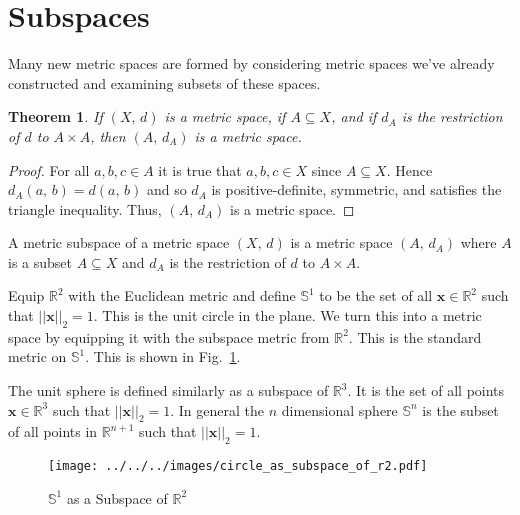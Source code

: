 \documentclass{article}
\theoremstyle{plain}
\newtheorem{theorem}{Theorem}[section]
\theoremstyle{normal}
\newenvironment{example}{%
    \pushQED{\qed}\renewcommand{\qedsymbol}{$\blacksquare$}\examplex%
}{%
    \popQED\endexamplex%
}
\newenvironment{definition}{%
    \pushQED{\qed}\renewcommand{\qedsymbol}{$\blacksquare$}\definitionx%
}{%
    \popQED\enddefinitionx%
}
\begin{document}
    \section{Subspaces}
        Many new metric spaces are formed by considering metric spaces we've
        already constructed and examining subsets of these spaces.
        \begin{theorem}
            If $(X,\,d)$ is a metric space, if $A\subseteq{X}$, and if
            $d_{A}$ is the restriction of $d$ to $A\times{A}$, then
            $(A,\,d_{A})$ is a metric space.
        \end{theorem}
        \begin{proof}
            For all $a,b,c\in{A}$ it is true that $a,b,c\in{X}$ since
            $A\subseteq{X}$. Hence $d_{A}(a,\,b)=d(a,\,b)$ and so
            $d_{A}$ is positive-definite, symmetric, and satisfies the
            triangle inequality. Thus, $(A,\,d_{A})$ is a metric space.
        \end{proof}
        \begin{definition}[\textbf{Metric Subspace}]
            A metric subspace of a metric space $(X,\,d)$ is a metric space
            $(A,\,d_{A})$ where $A$ is a subset $A\subseteq{X}$ and $d_{A}$
            is the restriction of $d$ to $A\times{A}$.
        \end{definition}
        \begin{example}
            Equip $\mathbb{R}^{2}$ with the Euclidean metric and define
            $\mathbb{S}^{1}$ to be the set of all $\mathbf{x}\in\mathbb{R}^{2}$
            such that $||\mathbf{x}||_{2}=1$. This is the unit circle in the
            plane. We turn this into a metric space by equipping it with the
            subspace metric from $\mathbb{R}^{2}$. This is the standard metric
            on $\mathbb{S}^{1}$. This is shown in
            Fig.~\ref{fig:circle_as_subspace_of_r2}.
        \end{example}
        \begin{example}
            The unit sphere is defined similarly as a subspace of
            $\mathbb{R}^{3}$. It is the set of all points
            $\mathbf{x}\in\mathbb{R}^{3}$ such that $||\mathbf{x}||_{2}=1$.
            In general the $n$ dimensional sphere $\mathbb{S}^{n}$ is the
            subset of all points in $\mathbb{R}^{n+1}$ such that
            $||\mathbf{x}||_{2}=1$.
        \end{example}
        \begin{figure}
            \centering
            \texttt{[image: ../../../images/circle\_as\_subspace\_of\_r2.pdf]}
            \caption{$\mathbb{S}^{1}$ as a Subspace of $\mathbb{R}^{2}$}
            \label{fig:circle_as_subspace_of_r2}
        \end{figure}
\end{document}
